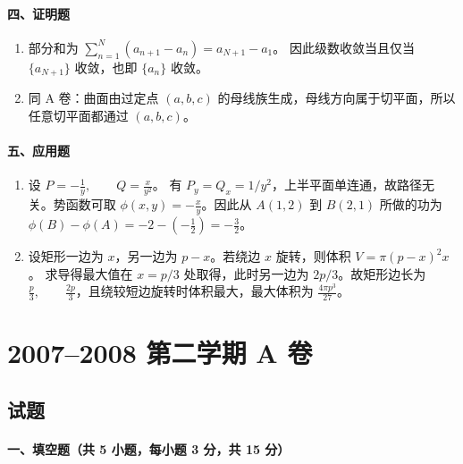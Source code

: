 \paragraph*{四、证明题}
\begin{enumerate}
  \item 部分和为 \(\displaystyle \sum_{n=1}^N(a_{n+1}-a_n)=a_{N+1}-a_1\)。
  因此级数收敛当且仅当 $\{a_{N+1}\}$ 收敛，也即 $\{a_n\}$ 收敛。
  \item 同 A 卷：曲面由过定点 $(a,b,c)$ 的母线族生成，母线方向属于切平面，所以任意切平面都通过 $(a,b,c)$。
\end{enumerate}

\paragraph*{五、应用题}
\begin{enumerate}
  \item 设 \(\displaystyle P=-\frac1y,\qquad Q=\frac{x}{y^2}\)。
  有 $P_y=Q_x=1/y^2$，上半平面单连通，故路径无关。势函数可取
  \(\displaystyle \phi(x,y)=-\frac{x}{y}\)。因此从 $A(1,2)$ 到 $B(2,1)$ 所做的功为
  \(\displaystyle \phi(B)-\phi(A)=-2-\left(-\frac12\right)=-\frac32\)。
  \item 设矩形一边为 $x$，另一边为 $p-x$。若绕边 $x$ 旋转，则体积
  \(\displaystyle V=\pi(p-x)^2x\)。
  求导得最大值在 $x=p/3$ 处取得，此时另一边为 $2p/3$。故矩形边长为
  \(\displaystyle \frac p3,\qquad \frac{2p}{3}\)，且绕较短边旋转时体积最大，最大体积为
  \(\displaystyle \frac{4\pi p^3}{27}\)。
\end{enumerate}

\section{2007--2008 第二学期 A 卷}

\subsection{试题}

\paragraph*{一、填空题（共 5 小题，每小题 3 分，共 15 分）}


